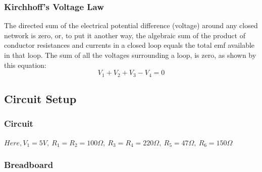 \documentclass{article}
\begin{document}
\vfill
\subsubsection{Kirchhoff's Voltage Law}

\begin{figure}
\end{figure}

The directed sum of the electrical potential difference (voltage) around any closed network is zero, or, to put it another way, the algebraic sum of the product of conductor resistances and currents in a closed loop equals the total emf available in that loop. The sum of all the voltages surrounding a loop, is zero, as shown by this equation:
\[V_1+V_2+V_3-V_4 = 0 \]

\newpage
\subsection{Circuit Setup}
\vspace{5px}
\subsubsection{Circuit}
\begin{center}
\end{center}

$Here, V_1 = 5V,\ R_1 = R_2 = 100 \Omega, \ R_3 = R_4 = 220 \Omega,\ R_5 = 47 \Omega,\ R_6 = 150 \Omega$
\subsubsection{Breadboard}
\end{document}
